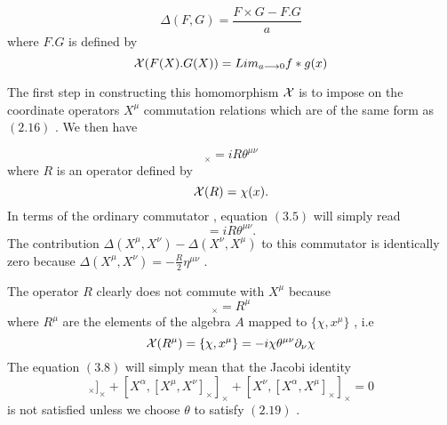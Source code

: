 \documentclass[a4paper,12pt]{article}
\begin{document}
\begin{equation}
{\Delta}(F,G)=\frac{F{\times}G - F.G}{a}
\end{equation}
where $F.G$ is defined by
\begin{equation}
{\cal X}(F(X).G(X))=Lim_{a{\longrightarrow}0}f*g(x)
\end{equation}

The first step in constructing this homomorphism ${\cal X}$ is to
impose on the coordinate operators $X^{\mu}$ commutation
relations which are of the same form as $(2.16)$  . We then have

\begin{equation}
[X^{\mu},X^{\nu}]_{\times}=iR{\theta}^{{\mu}{\nu}}
\end{equation}
where $R$ is an operator defined by
\begin{equation}
{\cal X}(R)=\chi(x).
\end{equation}
In terms of the ordinary commutator , equation $(3.5)$ will
simply read
\begin{equation}
[X^{\mu},X^{\nu}]=iR{\theta}^{{\mu}{\nu}}.
\end{equation}
The contribution
${\Delta}(X^{\mu},X^{\nu})-{\Delta}(X^{\nu},X^{\mu})$ to this
commutator is identically zero because
${\Delta}(X^{\mu},X^{\nu})=-\frac{R}{2}{\eta}^{{\mu}{\nu}}$ .


The operator $R$ clearly does not commute with $X^{\mu}$ because
\begin{equation}
[R,X^{\mu}]_{\times}=R^{\mu}
\end{equation}
where $R^{\mu}$ are the elements of the algebra $A$ mapped to $\{{\chi},x^{\mu}\}$ , i.e
\begin{equation}
{\cal X}(
R^{\mu})=\{{\chi},x^{\mu}\}=-i{\chi}{\theta}^{{\mu}{\nu}}{\partial}_{\nu}{\chi}
\end{equation}
The equation $(3.8)$ will simply mean that the Jacobi identity
\begin{equation}
[X^{\mu},[X^{\nu},X^{\alpha}]_{\times}]_{\times}+[X^{\alpha},[X^{\mu},X^{\nu}]_{\times}]_{\times}+[X^{\nu},[X^{\alpha},X^{\mu}]_{\times}]_{\times}=0
\end{equation}
is not satisfied unless we choose ${\theta}$ to satisfy $(2.19)$ .
\end{document}
